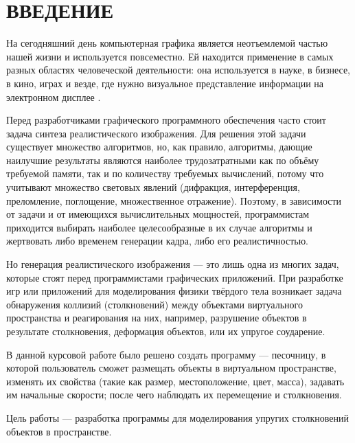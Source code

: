 \section*{ВВЕДЕНИЕ}

На сегодняшний день компьютерная графика является неотъемлемой частью нашей жизни и используется повсеместно.
Ей находится применение в самых разных областях человеческой деятельности: она используется в науке, в бизнесе, в кино, играх и везде, где нужно визуальное представление информации на электронном дисплее \cite{kurov}.

Перед разработчиками графического программного обеспечения часто стоит задача синтеза реалистического изображения.
Для решения этой задачи существует множество алгоритмов, но, как правило, алгоритмы, дающие наилучшие результаты являются наиболее трудозатратными как по объёму требуемой памяти, так и по количеству требуемых вычислений, потому что учитывают множество световых явлений (дифракция, интерференция, преломление, поглощение, множественное отражение).
Поэтому, в зависимости от задачи и от имеющихся вычислительных мощностей, программистам приходится выбирать наиболее целесообразные в их случае алгоритмы и жертвовать либо временем генерации кадра, либо его реалистичностью.

Но генерация реалистического изображения --- это лишь одна из многих задач, которые стоят перед программистами графических приложений.
При разработке игр или приложений для моделирования физики твёрдого тела возникает задача обнаружения коллизий (столкновений) между объектами виртуального пространства и реагирования на них, например, разрушение объектов в результате столкновения, деформация объектов, или их упругое соударение.

В данной курсовой работе было решено создать программу --- песочницу, в которой пользователь сможет размещать объекты в виртуальном пространстве, изменять их свойства (такие как размер, местоположение, цвет, масса), задавать им начальные скорости; после чего наблюдать их перемещение и столкновения.

Цель работы --- разработка программы для моделирования упругих столкновений объектов в пространстве.

